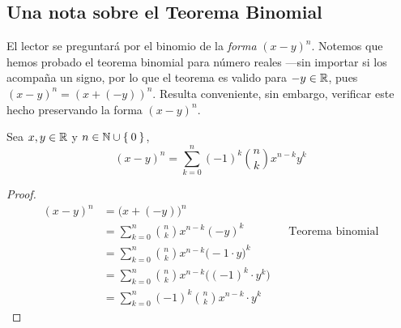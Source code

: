 \subsection*{Una nota sobre el Teorema Binomial}

El lector se preguntará por el binomio de la \textit{forma} $(x-y)^n$. Notemos que hemos probado el teorema binomial para número reales ---sin importar si los acompaña un signo, por lo que el teorema es valido para $-y\in \mathbb{R}$, pues $(x-y)^n = (x + (-y))^n$. Resulta conveniente, sin embargo, verificar este hecho preservando la forma $(x-y)^n$.
  
Sea $x,y\in \mathbb{R}$ y $n\in \mathbb{N}\cup\Set{0}$,
\[(x- y)^n = \sum_{k=0}^{n} (-1)^k \binom{n}{k} x^{n-k}y^k\]

\begin{proof}\leavevmode
  \begin{align*}
    (x- y)^n &= \Big(x+(-y)\Big)^n\\
    &= \sum_{k=0}^{n} \binom{n}{k} x^{n-k} (-y)^k && \text{Teorema binomial}\\
    &= \sum_{k=0}^{n} \binom{n}{k} x^{n-k} \big(-1\cdot y\big)^k\\
    &= \sum_{k=0}^{n} \binom{n}{k} x^{n-k} \Big((-1)^k \cdot y^k\Big)\\
    &= \sum_{k=0}^{n} (-1)^k \binom{n}{k} x^{n-k}\cdot y^k
  \end{align*}
\end{proof}